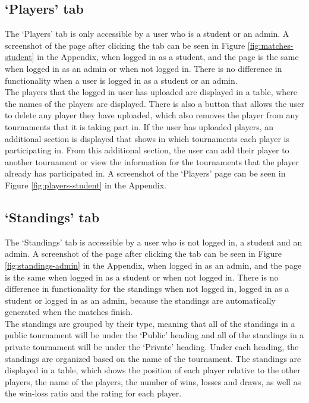 \documentclass[a4paper, 11pt]{report}
\begin{document}
\subsection{`Players' tab}
\label{sec:impl-tab-players}

The `Players' tab is only accessible by a user who is a student or an admin. A
screenshot of the page after clicking the tab can be seen in Figure
\ref{fig:matches-student} in the Appendix, when logged in as a student, and the
page is the same when logged in as an admin or when not logged in. There is
no difference in functionality when a user is logged in as a student or an
admin. \\

The players that the logged in user has uploaded are displayed in a table, where
the names of the players are displayed. There is also a button that allows the
user to delete any player they have uploaded, which also removes the player from
any tournaments that it is taking part in. If the user has uploaded players, an
additional section is displayed that shows in which tournaments each player is
participating in. From this additional section, the user can add their player
to another tournament or view the information for the tournaments that the player
already has participated in. A screenshot of the `Players' page can be seen in
Figure \ref{fig:players-student} in the Appendix.

\subsection{`Standings' tab}
\label{sec:impl-tab-standings}

The `Standings' tab is accessible by a user who is not logged in, a student
and an admin. A screenshot of the page after clicking the tab can be seen in
Figure \ref{fig:standings-admin} in the Appendix, when logged in as an admin,
and the page is the same when logged in as a student or when not logged in.
There is no difference in functionality for the standings when not logged in,
logged in as a student or logged in as an admin, because the standings are
automatically generated when the matches finish. \\

The standings are grouped by their type, meaning that all of the standings in a
public tournament will be under the `Public' heading and all of the standings in
a private tournament will be under the `Private' heading. Under each heading, the
standings are organized based on the name of the tournament. The standings are
displayed in a table, which shows the position of each player relative to the
other players, the name of the players, the number of wins, losses and draws, as
well as the win-loss ratio and the rating for each player.
\end{document}
